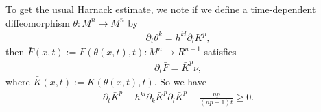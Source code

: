 \documentclass{amsart}
\theoremstyle{definition}
\theoremstyle{remark}
\numberwithin{equation}{section}
\begin{document}
To get the usual Harnack estimate, we note if we define a time-dependent diffeomorphism $\theta: M^n\to M^n$ by
\begin{align}
\partial_t\theta^k=h^{kl}\partial_l K^{ p },
\end{align}
then $\bar{F}(x,t):=F(\theta(x,t),t):M^{n}\to R^{n+1}$ satisfies
\begin{align}
\partial_t\bar{F}=\bar{K}^{ p }\nu,
\end{align}
where $\bar{K}(x,t):=K(\theta(x,t),t)$. So we have
\begin{align}
\partial_t\bar{K}^{ p }-h^{kl}\partial_k\bar{K}^{ p }\partial_l\bar{K}^{ p }+\frac{n p }{(n p +1)t}\geq 0.
\end{align}
\end{document}
